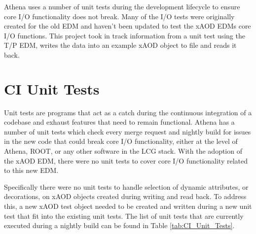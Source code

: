 Athena uses a number of unit tests during the development lifecycle to ensure core I/O functionality does not break.
Many of the I/O tests were originally created for the old EDM and haven't been updated to test the xAOD EDMs core I/O functions.
This project took in track information from a unit test using the T/P EDM, writes the data into an example xAOD object to file and reads it back.

\section{CI Unit Tests}
\label{sec:Mod_utests_CI}
Unit tests are programs that act as a catch during the continuous integration of a codebase and exhaust features that need to remain functional. 
Athena has a number of unit tests which check every merge request and nightly build for issues in the new code that could break core I/O functionality, either at the level of Athena, ROOT, or any other software in the LCG stack.
With the adoption of the xAOD EDM, there were no unit tests to cover core I/O functionality related to this new EDM. 

Specifically there were no unit tests to handle selection of dynamic attributes, or decorations, on xAOD objects created during writing and read back.
To address this, a new xAOD test object needed to be created and written during a new unit test that fit into the existing unit tests.
The list of unit tests that are currently executed during a nightly build can be found in Table \ref{tab:CI_Unit_Tests}.


